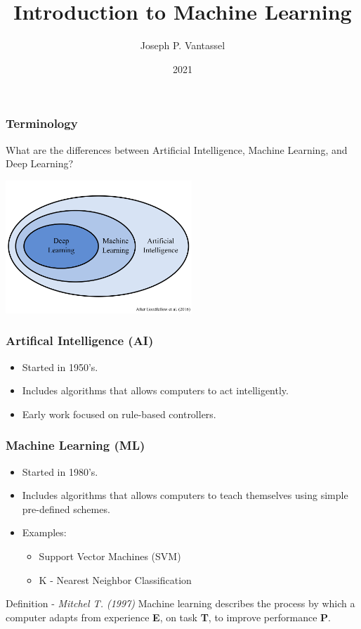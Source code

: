 \documentclass{beamer}
\title{Introduction to Machine Learning}
\author{Joseph P. Vantassel}
\institute{The University of Texas at Austin}
\date{2021}
\begin{document}
\frame{\titlepage}


\begin{frame}

\frametitle{Terminology}

What are the differences between Artificial Intelligence, Machine Learning, and Deep Learning?

\begin{center}
\includegraphics[height=5cm]{figs/ai_ml_dl_diagram.png}
\end{center}

\end{frame}


\begin{frame}

\frametitle{Artifical Intelligence (AI)}

\begin{itemize}
    \item Started in 1950's.
    \item Includes algorithms that allows computers to act intelligently.
    \item Early work focused on rule-based controllers.
\end{itemize}

\end{frame}


\begin{frame}

\frametitle{Machine Learning (ML)}

\begin{itemize}
    \item Started in 1980's.
    \item Includes algorithms that allows computers to teach themselves using simple pre-defined schemes.
    \item Examples:
    \begin{itemize}
        \item Support Vector Machines (SVM)
        \item K - Nearest Neighbor Classification
    \end{itemize}
\end{itemize}

\begin{block}{Definition - \textit{Mitchel T. (1997)}}
    Machine learning describes the process by which a computer adapts
    from experience \textbf{E}, on task \textbf{T}, to improve
    performance \textbf{P}.
\end{block}

\end{frame}
\end{document}
